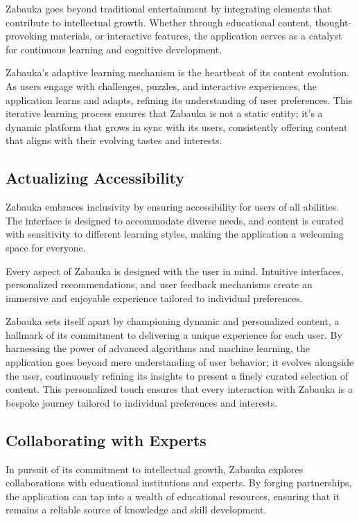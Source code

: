 Zabauka goes beyond traditional entertainment by integrating elements that contribute to intellectual growth. Whether 
through educational content, thought-provoking materials, or interactive features, the application serves as a catalyst 
for continuous learning and cognitive development.

Zabauka's adaptive learning mechanism is the heartbeat of its content evolution. As users engage with challenges, 
puzzles, and interactive experiences, the application learns and adapts, refining its understanding of user preferences. 
This iterative learning process ensures that Zabauka is not a static entity; it's a dynamic platform that grows in sync
with its users, consistently offering content that aligns with their evolving tastes and interests.


\subsection{Actualizing Accessibility}

Zabauka embraces inclusivity by ensuring accessibility for users of all abilities. The interface is designed to 
accommodate diverse needs, and content is curated with sensitivity to different learning styles, making the application 
a welcoming space for everyone.

Every aspect of Zabauka is designed with the user in mind. Intuitive interfaces, personalized recommendations, and user 
feedback mechanisms create an immersive and enjoyable experience tailored to individual preferences.

Zabauka sets itself apart by championing dynamic and personalized content, a hallmark of its commitment to delivering a 
unique experience for each user. By harnessing the power of advanced algorithms and machine learning, the application 
goes beyond mere understanding of user behavior; it evolves alongside the user, continuously refining its insights to
present a finely curated selection of content. This personalized touch ensures that every interaction with Zabauka is a 
bespoke journey tailored to individual preferences and interests.


\subsection{Collaborating with Experts}

In pursuit of its commitment to intellectual growth, Zabauka explores collaborations with educational institutions and 
experts. By forging partnerships, the application can tap into a wealth of educational resources, ensuring that it 
remains a reliable source of knowledge and skill development.

